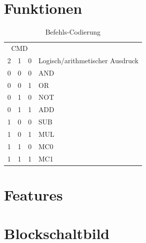 \documentclass[11pt]{report}
\begin{document}
	\section{Funktionen}
	\begin{table}[h]
		\centering
		\label{codierungstabelle}
		\begin{tabular}{|lll|l|}
			\hline
			\multicolumn{3}{|c|}{CMD}                            & \multicolumn{1}{c|}{}             \\
			\multicolumn{1}{|l|}{2} & \multicolumn{1}{l|}{1} & 0 & Logisch/arithmetischer Ausdruck \\ \hline
			0                       & 0                      & 0 & AND                               \\ \hline
			0                       & 0                      & 1 & OR                                \\ \hline
			0                       & 1                      & 0 & NOT                               \\ \hline
			0                       & 1                      & 1 & ADD                               \\ \hline
			1                       & 0                      & 0 & SUB                               \\ \hline
			1                       & 0                      & 1 & MUL                               \\ \hline
			1                       & 1                      & 0 & MC0                               \\ \hline
			1                       & 1                      & 1 & MC1                               \\ \hline
		\end{tabular}
		\caption{Befehls-Codierung}
	\end{table}
	
	\section{Features}
	
	\section{Blockschaltbild}
	
\end{document}
